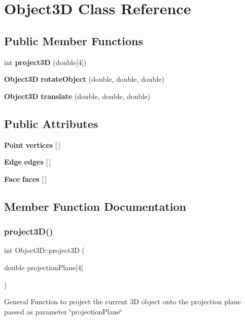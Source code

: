 \section{Object3D Class Reference}
\label{class_object3_d}
\subsection*{Public Member Functions}
\begin{DoxyCompactItemize}
\item 
int \textbf{ project3D} (double[4])
\item 
\textbf{ Object3D} \textbf{ rotate\+Object} (double, double, double)
\item 
\textbf{ Object3D} \textbf{ translate} (double, double, double)
\end{DoxyCompactItemize}
\subsection*{Public Attributes}
\begin{DoxyCompactItemize}
\item 
\textbf{ Point} \textbf{ vertices} [$\,$]
\item 
\textbf{ Edge} \textbf{ edges} [$\,$]
\item 
\textbf{ Face} \textbf{ faces} [$\,$]
\end{DoxyCompactItemize}


\subsection{Member Function Documentation}
\mbox{\label{class_object3_d_a17e177a936a71e0a5599ce7ca76bae78}} 
\subsubsection{project3\+D()}
{\footnotesize\ttfamily int Object3\+D\+::project3D (\begin{DoxyParamCaption}\item[{double}]{projection\+Plane[4] }\end{DoxyParamCaption})}

General Function to project the current 3D object onto the projection plane passed as parameter \char`\"{}projection\+Plane\char`\"{}\mbox{\label{class_object3_d_a476b3de610cb30be0b050b4701ba4701}} 
